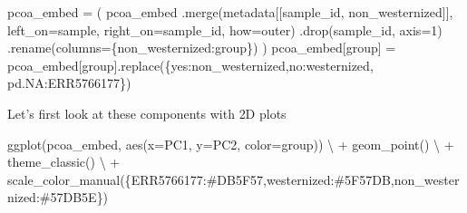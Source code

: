 \documentclass[
  letterpaper,
]{book}
\newenvironment{Shaded}{}{}
\newcommand{\DecValTok}[1]{\textcolor[rgb]{0.00,0.36,0.77}{#1}}
\newcommand{\NormalTok}[1]{\textcolor[rgb]{0.14,0.16,0.18}{#1}}
\newcommand{\OperatorTok}[1]{\textcolor[rgb]{0.14,0.16,0.18}{#1}}
\newcommand{\StringTok}[1]{\textcolor[rgb]{0.01,0.18,0.38}{#1}}
\begin{document}
\begin{Shaded}
\begin{Highlighting}[]
\NormalTok{pcoa\_embed }\OperatorTok{=}\NormalTok{ (}
\NormalTok{    pcoa\_embed}
\NormalTok{    .merge(metadata[[}\StringTok{\textquotesingle{}sample\_id\textquotesingle{}}\NormalTok{, }\StringTok{\textquotesingle{}non\_westernized\textquotesingle{}}\NormalTok{]], left\_on}\OperatorTok{=}\StringTok{\textquotesingle{}sample\textquotesingle{}}\NormalTok{, right\_on}\OperatorTok{=}\StringTok{\textquotesingle{}sample\_id\textquotesingle{}}\NormalTok{, how}\OperatorTok{=}\StringTok{\textquotesingle{}outer\textquotesingle{}}\NormalTok{)}
\NormalTok{    .drop(}\StringTok{\textquotesingle{}sample\_id\textquotesingle{}}\NormalTok{, axis}\OperatorTok{=}\DecValTok{1}\NormalTok{)}
\NormalTok{    .rename(columns}\OperatorTok{=}\NormalTok{\{}\StringTok{\textquotesingle{}non\_westernized\textquotesingle{}}\NormalTok{:}\StringTok{\textquotesingle{}group\textquotesingle{}}\NormalTok{\})}
\NormalTok{)}
\NormalTok{pcoa\_embed[}\StringTok{\textquotesingle{}group\textquotesingle{}}\NormalTok{] }\OperatorTok{=}\NormalTok{ pcoa\_embed[}\StringTok{\textquotesingle{}group\textquotesingle{}}\NormalTok{].replace(\{}\StringTok{\textquotesingle{}yes\textquotesingle{}}\NormalTok{:}\StringTok{\textquotesingle{}non\_westernized\textquotesingle{}}\NormalTok{,}\StringTok{\textquotesingle{}no\textquotesingle{}}\NormalTok{:}\StringTok{\textquotesingle{}westernized\textquotesingle{}}\NormalTok{, pd.NA:}\StringTok{\textquotesingle{}ERR5766177\textquotesingle{}}\NormalTok{\})}
\end{Highlighting}
\end{Shaded}

Let's first look at these components with 2D plots

\begin{Shaded}
\begin{Highlighting}[]
\NormalTok{ggplot(pcoa\_embed, aes(x}\OperatorTok{=}\StringTok{\textquotesingle{}PC1\textquotesingle{}}\NormalTok{, y}\OperatorTok{=}\StringTok{\textquotesingle{}PC2\textquotesingle{}}\NormalTok{, color}\OperatorTok{=}\StringTok{\textquotesingle{}group\textquotesingle{}}\NormalTok{)) }\OperatorTok{\textbackslash{}}
\OperatorTok{+}\NormalTok{ geom\_point() }\OperatorTok{\textbackslash{}}
\OperatorTok{+}\NormalTok{ theme\_classic() }\OperatorTok{\textbackslash{}}
\OperatorTok{+}\NormalTok{ scale\_color\_manual(\{}\StringTok{\textquotesingle{}ERR5766177\textquotesingle{}}\NormalTok{:}\StringTok{\textquotesingle{}\#DB5F57\textquotesingle{}}\NormalTok{,}\StringTok{\textquotesingle{}westernized\textquotesingle{}}\NormalTok{:}\StringTok{\textquotesingle{}\#5F57DB\textquotesingle{}}\NormalTok{,}\StringTok{\textquotesingle{}non\_westernized\textquotesingle{}}\NormalTok{:}\StringTok{\textquotesingle{}\#57DB5E\textquotesingle{}}\NormalTok{\})}
\end{Highlighting}
\end{Shaded}
\end{document}
